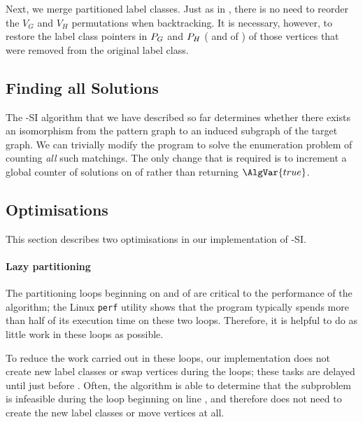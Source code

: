 Next, we merge partitioned label classes.  Just as in \McSplit, there is
no need to reorder the $V_G$ and $V_H$ permutations when backtracking.
It is necessary, however, to restore the label class pointers in $P_G$
and $P_H$ ( and 
of ) of those vertices that were removed from
the original label class.

\FloatBarrier

\subsection{Finding all Solutions}

The \McSplit-SI algorithm that we have described so far determines whether there
exists an isomorphism from the pattern graph to an induced subgraph of the target
graph.  We can trivially modify the program to solve the enumeration problem
of counting \emph{all} such matchings.  The only change that is required is
to increment a global counter of solutions on
 of  rather than returning
$\AlgVar{true}$.

\subsection{Optimisations}\label{subsec:mcsplit-si-optimisations}

This section describes two optimisations in our implementation of \McSplit-SI.

\paragraph{Lazy partitioning}
The partitioning loops beginning on 
and  of  are critical to
the performance of the algorithm; the Linux \texttt{perf} utility shows
that the program typically spends more than half of its execution time
on these two loops.  Therefore, it is helpful to do as little work in these
loops as possible.

To reduce the work carried out in these loops, our implementation does
not create new label classes or swap vertices during the loops; these
tasks are delayed until just before .
Often, the algorithm is able to determine that the subproblem
is infeasible during the loop beginning on line
, and therefore does
not need to create the new label classes or move vertices at all.

